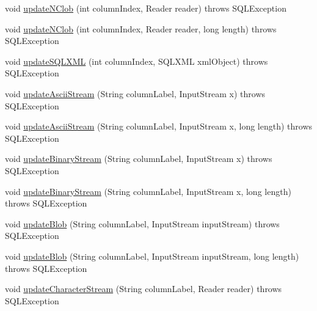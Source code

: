 \begin{DoxyCompactItemize}
\item 
void \mbox{\hyperlink{classcom_1_1mysql_1_1cj_1_1jdbc_1_1result_1_1_updatable_result_set_a3a83a1062b84f836a53c501da8e41069}{update\+N\+Clob}} (int column\+Index, Reader reader)  throws S\+Q\+L\+Exception 
\item 
void \mbox{\hyperlink{classcom_1_1mysql_1_1cj_1_1jdbc_1_1result_1_1_updatable_result_set_a81dd90de41f3f0c4c05c30062383e12a}{update\+N\+Clob}} (int column\+Index, Reader reader, long length)  throws S\+Q\+L\+Exception 
\item 
void \mbox{\hyperlink{classcom_1_1mysql_1_1cj_1_1jdbc_1_1result_1_1_updatable_result_set_a202aa68264e00182bd12fc64867b417e}{update\+S\+Q\+L\+X\+ML}} (int column\+Index, S\+Q\+L\+X\+ML xml\+Object)  throws S\+Q\+L\+Exception 
\item 
void \mbox{\hyperlink{classcom_1_1mysql_1_1cj_1_1jdbc_1_1result_1_1_updatable_result_set_a95db253fd08bf8769d34800d66faad98}{update\+Ascii\+Stream}} (String column\+Label, Input\+Stream x)  throws S\+Q\+L\+Exception 
\item 
void \mbox{\hyperlink{classcom_1_1mysql_1_1cj_1_1jdbc_1_1result_1_1_updatable_result_set_a23eaa655b627175bc4528edfd1f724ff}{update\+Ascii\+Stream}} (String column\+Label, Input\+Stream x, long length)  throws S\+Q\+L\+Exception 
\item 
void \mbox{\hyperlink{classcom_1_1mysql_1_1cj_1_1jdbc_1_1result_1_1_updatable_result_set_a9032ba89281b7ed97b0a449199f64d0f}{update\+Binary\+Stream}} (String column\+Label, Input\+Stream x)  throws S\+Q\+L\+Exception 
\item 
void \mbox{\hyperlink{classcom_1_1mysql_1_1cj_1_1jdbc_1_1result_1_1_updatable_result_set_a62c06e12f819f3c7e7dba30d2fc89818}{update\+Binary\+Stream}} (String column\+Label, Input\+Stream x, long length)  throws S\+Q\+L\+Exception 
\item 
void \mbox{\hyperlink{classcom_1_1mysql_1_1cj_1_1jdbc_1_1result_1_1_updatable_result_set_a8966187864bd5a20977093399db0c492}{update\+Blob}} (String column\+Label, Input\+Stream input\+Stream)  throws S\+Q\+L\+Exception 
\item 
void \mbox{\hyperlink{classcom_1_1mysql_1_1cj_1_1jdbc_1_1result_1_1_updatable_result_set_a434c441a4e7acfea42d9d8e4a8a761ec}{update\+Blob}} (String column\+Label, Input\+Stream input\+Stream, long length)  throws S\+Q\+L\+Exception 
\item 
void \mbox{\hyperlink{classcom_1_1mysql_1_1cj_1_1jdbc_1_1result_1_1_updatable_result_set_a3fae6d81d62b8a0dddd5dc1d73f98115}{update\+Character\+Stream}} (String column\+Label, Reader reader)  throws S\+Q\+L\+Exception 

\end{DoxyCompactItemize}
